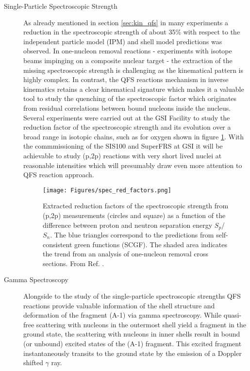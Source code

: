 \begin{description}
\item[Single-Particle Spectroscopic Strength]As already mentioned in section \ref{sec:kin_qfs} in many experiments a reduction in the spectroscopic strength of about 35\% with respect to the independent particle model (IPM) and shell model predictions was observed. In one-nucleon removal reactions - experiments with isotope beams impinging on a composite nuclear target - the extraction of the missing spectroscopic strength is challenging as the kinematical pattern is highly complex. In contrast, the QFS reactions mechanism in inverse kinematics retains a clear kinematical signature which makes it a valuable tool to study the quenching of the spectroscopic factor which originates from residual correlations between bound nucleons inside the nucleus. \newline
Several experiments were carried out at the GSI Facility to study the reduction factor of the spectroscopic strength  and its evolution over a broad range in isotopic chains, such as for oxygen shown in figure \ref{fig:red_factor}. With the commmissioning of the SIS100 and SuperFRS at GSI it will be achievable to study (p,2p) reactions with very short lived nuclei at reasonable intensities which will presumably draw even more attention to QFS reaction approach.  
\begin{figure}[htpb]
    \centering
    \texttt{[image: Figures/spec\_red\_factors.png]}
    \caption{
   	Extracted reduction factors of the spectroscopic strength from (p,2p) measurements (circles and square) as a function of the difference between proton and neutron separation energy $S_p$/$S_n$. The blue triangles correspond to the predictions from self-consistent green functions (SCGF). The shaded area indicates the trend from an analysis of one-nucleon removal cross sections. From Ref. \cite{atar2018quasifree}.   
    }
    \label{fig:red_factor}
\end{figure}
\item[Gamma Spectroscopy]Alongside to the study of the single-particle spectroscopic strengths QFS reactions provide valuable information of the shell structure and deformation of the fragment (A-1) via gamma spectroscopy. While quasi-free scattering with nucleons in the outermost shell yield a fragment in the ground state, the scattering with nucleons in inner shells result in bound (or unbound) excited states of the (A-1) fragment. This excited fragment instantaneously transits to the ground state by the emission of a Doppler shifted $\gamma$ ray.\newline

\end{description}
